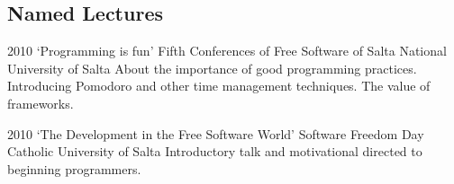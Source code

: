 \documentclass[11pt,a4paper]{moderncv}
\begin{document}
\subsection{Named Lectures}                                                                                       %

\cventry                                                                                                          %
    {2010}                                                                                                        %
    {`Programming is fun'}                                                                                        %
    {Fifth Conferences of Free Software of Salta}                                                                 %
    {National University of Salta}                                                                                %
    {}                                                                                                            %
    {                                                                                                             %
        About the importance of good programming practices.                                                       %
        Introducing Pomodoro and other time management techniques.                                                %
        The value of frameworks.                                                                                  %
    }                                                                                                             %

\cventry                                                                                                          %
    {2010}                                                                                                        %
    {`The Development in the Free Software World'}                                                                %
    {Software Freedom Day}                                                                                        %
    {Catholic University of Salta}                                                                                %
    {}                                                                                                            %
    {                                                                                                             %
        Introductory talk and motivational directed to beginning programmers.                                     %
    }                                                                                                             %
\end{document}
